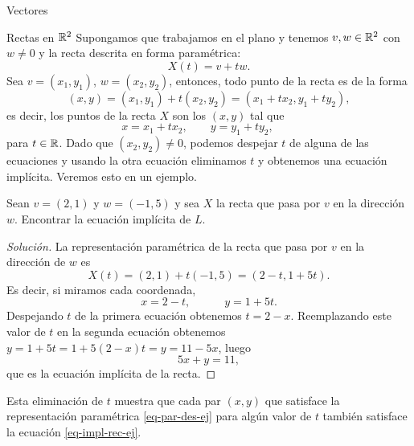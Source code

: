 \begin{chapter}{Vectores}
\begin{section}{Rectas en $\mathbb R^2$}
        Supongamos que trabajamos en el plano y tenemos $v, w \in \mathbb R^2$ con $w \not= 0$ y la recta descrita en forma paramétrica:
        \begin{equation*}
        X(t) =v +tw.
        \end{equation*}
        Sea $v = (x_1,y_1)$, $w = (x_2,y_2)$,  entonces, todo punto de la recta es de la forma
        \begin{equation*}
        (x,y) =(x_1,y_1) +t(x_2,y_2) = (x_1+tx_2,y_1+ty_2),
        \end{equation*}
        es decir, los puntos de la recta $X$ son los $(x,y)$ tal que
        \begin{equation*}
            x = x_1+tx_2, \qquad y = y_1+ty_2, \qquad
        \end{equation*}
        para $t \in \mathbb R$. Dado  que $(x_2,y_2) \ne 0$, podemos despejar $t$  de alguna de las ecuaciones y usando la otra ecuación eliminamos $t$ y obtenemos una ecuación implícita. Veremos esto en un ejemplo.
        
        \begin{ejemplo*}
            Sean $v = (2, 1)$ y $w = (- 1, 5)$ y sea $X$ la recta que pasa por $v$  en la dirección $w$. Encontrar la ecuación  implícita de $L$.
    \end{ejemplo*}
\begin{proof}[Solución]	
            La representación paramétrica de la recta que pasa por  $v$ en la dirección de $w$ es 
            \begin{equation*}
                X(t)= (2,1)+ t(-1,5) = (2-t,1+5t).
            \end{equation*}
             Es decir, si  miramos cada coordenada, 
            \begin{equation}\label{eq-par-des-ej}
            x = 2 - t, \qquad\quad y = 1 + 5t.
            \end{equation}
            Despejando $t$ de la primera ecuación obtenemos $t = 2-x$. Reemplazando este valor de $t$  en la segunda ecuación obtenemos $y = 1 + 5t=1 + 5(2-x)t= y = 11- 5x$, luego
            \begin{equation}\label{eq-impl-rec-ej}
                5x + y = 11,
            \end{equation}
            que es la ecuación implícita de la recta.
            
            \end{proof}	
            
            Esta eliminación de $t$ muestra que cada par $(x, y)$ que satisface la representación paramétrica \eqref{eq-par-des-ej} para algún valor de $t$ también satisface la ecuación \eqref{eq-impl-rec-ej}.
            

\end{section}
\end{chapter}
